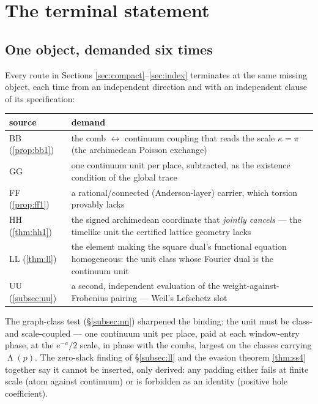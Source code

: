\documentclass[11pt,reqno]{amsart}
\theoremstyle{plain}
\theoremstyle{definition}
\theoremstyle{remark}
\DeclareMathOperator{\Lam}{\Lambda}
\begin{document}
\section{The terminal statement}\label{sec:terminal}

\subsection{One object, demanded six times}

Every route in Sections \ref{sec:compact}--\ref{sec:index} terminates at the same missing
object, each time from an independent direction and with an independent clause of its
specification:

\begin{center}
\small
\begin{tabular}{p{} p{}}
\toprule
\textbf{source} & \textbf{demand} \\
\midrule
BB (\ref{prop:bb1}) & the comb $\leftrightarrow$ continuum coupling that reads the scale
$\kappa = \pi$ (the archimedean Poisson exchange) \\
GG & one continuum unit per place, subtracted, as the existence condition of the global
trace \\
FF (\ref{prop:ff1}) & a rational/connected (Anderson-layer) carrier, which torsion provably
lacks \\
HH (\ref{thm:hh1}) & the signed archimedean coordinate that \emph{jointly cancels} --- the
timelike unit the certified lattice geometry lacks \\
LL (\ref{thm:ll}) & the element making the square dual's functional equation homogeneous:
the unit class whose Fourier dual is the continuum unit \\
UU (\ref{subsec:uu}) & a second, independent evaluation of the weight-against-Frobenius
pairing --- Weil's Lefschetz slot \\
\bottomrule
\end{tabular}
\end{center}

The graph-class test (\S\ref{subsec:nn}) sharpened the binding: the unit must be class- and
scale-coupled --- one continuum unit per place, paid at each window-entry phase, at the
$e^{-a}/2$ scale, in phase with the combs, largest on the classes carrying $\Lam(p)$. The
zero-slack finding of \S\ref{subsec:ll} and the evasion theorem \ref{thm:ss4} together say it
cannot be inserted, only derived: any padding either fails at finite scale (atom against
continuum) or is forbidden as an identity (positive hole coefficient).
\end{document}
